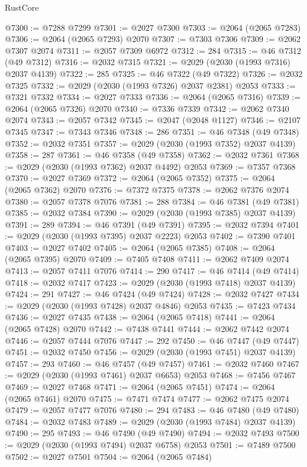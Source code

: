 \begin{lexlean}{RustCore}
\begin{coremodule}
@7300 := @7288 @7299
@7301 := @2027 @7300
@7303 := @2064 (@2065 @7283)
@7306 := @2064 (@2065 @7293) @2070
@7307 := @7303 @7306
@7309 := @2062 @7307 @2074
@7311 := @2057 @7309 @6972
@7312 := 284
@7315 := @46 @7312 (@49 @7312)
@7316 := @2032 @7315
@7321 := @2029 (@2030 (@1993 @7316) @2037 @4139)
@7322 := 285
@7325 := @46 @7322 (@49 @7322)
@7326 := @2032 @7325
@7332 := @2029 (@2030 (@1993 @7326) @2037 @2381) @2053
@7333 := @7321 @7332
@7334 := @2027 @7333
@7336 := @2064 (@2065 @7316)
@7339 := @2064 (@2065 @7326) @2070
@7340 := @7336 @7339
@7342 := @2062 @7340 @2074
@7343 := @2057 @7342
@7345 := @2047 (@2048 @1127)
@7346 := @2107 @7345
@7347 := @7343 @7346
@7348 := 286
@7351 := @46 @7348 (@49 @7348)
@7352 := @2032 @7351
@7357 := @2029 (@2030 (@1993 @7352) @2037 @4139)
@7358 := 287
@7361 := @46 @7358 (@49 @7358)
@7362 := @2032 @7361
@7368 := @2029 (@2030 (@1993 @7362) @2037 @4492) @2053
@7369 := @7357 @7368
@7370 := @2027 @7369
@7372 := @2064 (@2065 @7352)
@7375 := @2064 (@2065 @7362) @2070
@7376 := @7372 @7375
@7378 := @2062 @7376 @2074
@7380 := @2057 @7378 @7076
@7381 := 288
@7384 := @46 @7381 (@49 @7381)
@7385 := @2032 @7384
@7390 := @2029 (@2030 (@1993 @7385) @2037 @4139)
@7391 := 289
@7394 := @46 @7391 (@49 @7391)
@7395 := @2032 @7394
@7401 := @2029 (@2030 (@1993 @7395) @2037 @2223) @2053
@7402 := @7390 @7401
@7403 := @2027 @7402
@7405 := @2064 (@2065 @7385)
@7408 := @2064 (@2065 @7395) @2070
@7409 := @7405 @7408
@7411 := @2062 @7409 @2074
@7413 := @2057 @7411 @7076
@7414 := 290
@7417 := @46 @7414 (@49 @7414)
@7418 := @2032 @7417
@7423 := @2029 (@2030 (@1993 @7418) @2037 @4139)
@7424 := 291
@7427 := @46 @7424 (@49 @7424)
@7428 := @2032 @7427
@7434 := @2029 (@2030 (@1993 @7428) @2037 @4846) @2053
@7435 := @7423 @7434
@7436 := @2027 @7435
@7438 := @2064 (@2065 @7418)
@7441 := @2064 (@2065 @7428) @2070
@7442 := @7438 @7441
@7444 := @2062 @7442 @2074
@7446 := @2057 @7444 @7076
@7447 := 292
@7450 := @46 @7447 (@49 @7447)
@7451 := @2032 @7450
@7456 := @2029 (@2030 (@1993 @7451) @2037 @4139)
@7457 := 293
@7460 := @46 @7457 (@49 @7457)
@7461 := @2032 @7460
@7467 := @2029 (@2030 (@1993 @7461) @2037 @6653) @2053
@7468 := @7456 @7467
@7469 := @2027 @7468
@7471 := @2064 (@2065 @7451)
@7474 := @2064 (@2065 @7461) @2070
@7475 := @7471 @7474
@7477 := @2062 @7475 @2074
@7479 := @2057 @7477 @7076
@7480 := 294
@7483 := @46 @7480 (@49 @7480)
@7484 := @2032 @7483
@7489 := @2029 (@2030 (@1993 @7484) @2037 @4139)
@7490 := 295
@7493 := @46 @7490 (@49 @7490)
@7494 := @2032 @7493
@7500 := @2029 (@2030 (@1993 @7494) @2037 @6758) @2053
@7501 := @7489 @7500
@7502 := @2027 @7501
@7504 := @2064 (@2065 @7484)

\end{coremodule}
\end{lexlean}
